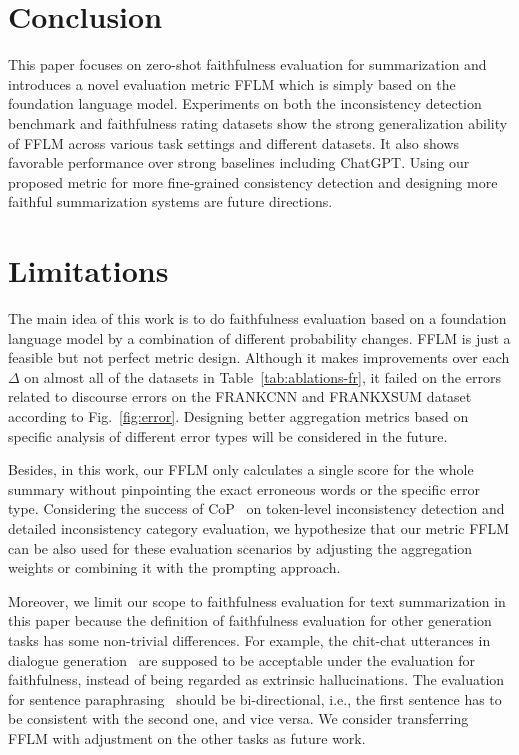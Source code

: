 \section{Conclusion}

This paper focuses on zero-shot faithfulness evaluation for summarization and introduces a novel evaluation metric FFLM which is simply based on the foundation language model. Experiments on both the inconsistency detection benchmark and faithfulness rating datasets show the strong generalization ability of FFLM across various task settings and different datasets. It also shows favorable performance over strong baselines including ChatGPT. 
Using our proposed metric for more fine-grained consistency detection and 
designing more faithful summarization systems are future directions.


\section*{Limitations}

The main idea of this work is to do faithfulness evaluation based on a foundation language model by a combination of different probability changes. FFLM is just a feasible but not perfect metric design. Although it makes improvements over each $\Delta$ on almost all of the datasets in Table~\ref{tab:ablations-fr}, it failed on the errors related to discourse errors on the FRANKCNN and FRANKXSUM dataset according to Fig.~\ref{fig:error}. Designing better aggregation metrics based on specific analysis of different error types will be considered in the future.

Besides, in this work, our FFLM only calculates a single score for the whole 
summary without pinpointing the exact erroneous words or the specific 
error type. Considering the success of CoP~\cite{she2022cop} on 
token-level inconsistency detection and detailed inconsistency category 
evaluation, we hypothesize that our metric FFLM can be also used for these evaluation scenarios by adjusting the aggregation weights or combining it with the prompting approach.

Moreover, we limit our scope to faithfulness evaluation for text summarization in this paper because the definition of faithfulness evaluation for other generation tasks has some non-trivial differences. For example, the chit-chat utterances in dialogue generation~\cite{dziri2022faithdial} are supposed to be acceptable under the evaluation for faithfulness, instead of being regarded as extrinsic hallucinations. The evaluation for sentence paraphrasing~\cite{zhang2019paws} should be bi-directional, i.e., the first sentence has to be consistent with the second one, and vice versa. We consider transferring FFLM with adjustment on the other tasks as future work.
